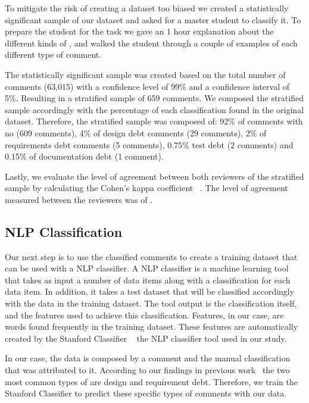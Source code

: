 To mitigate the risk of creating a dataset too biased we created a statistically significant sample of our dataset and asked for a master student to classify it. To prepare the student for the task we gave an 1 hour explanation about the different kinds of \SATD, and walked the student through a couple of examples of each different type of \SATD comment. 

The statistically significant sample was created based on the total number of comments (63,015) with a confidence level of 99\% and a confidence interval of 5\%. Resulting in a stratified sample of 659 comments. We composed the stratified sample accordingly with the percentage of each classification found in the original dataset. Therefore, the stratified sample was composed of: 92\% of comments with no \SATD (609 comments), 4\% of design debt comments (29 comments), 2\% of requirements debt comments (5 comments), 0.75\% test debt (2 comments) and 0.15\% of documentation debt (1 comment).

Lastly, we evaluate the level of agreement between both reviewers of the stratified sample by calculating the Cohen's kappa coefficient ~\cite{cohen1960coefficient}. The level of agreement measured between the reviewers was of \todo{}.   
 

\subsection{NLP Classification} %
\label{sub:run_the_nlp_classifier}


Our next step is to use the classified \SATD comments to create a training dataset that can be used with a NLP classifier. A NLP classifier is a machine learning tool that takes as input a number of data items along with a classification for each data item. In addition, it takes a test dataset that will be classified accordingly with the data in the training dataset. The tool output is the classification itself, and the features used to achieve this classification. Features, in our case, are words found frequently in the training dataset. These features are automatically created by the Stanford Classifier ~\cite{Manning2014ACL} the NLP classifier tool used in our study. 

In our case, the data is composed by a comment and the manual classification that was attributed to it. According to our findings in previous work~\cite{Maldonado2015MTD} the two most common types of \SATD are design and requirement debt. Therefore, we train the Stanford Classifier to predict these specific types of \SATD comments with our data.

